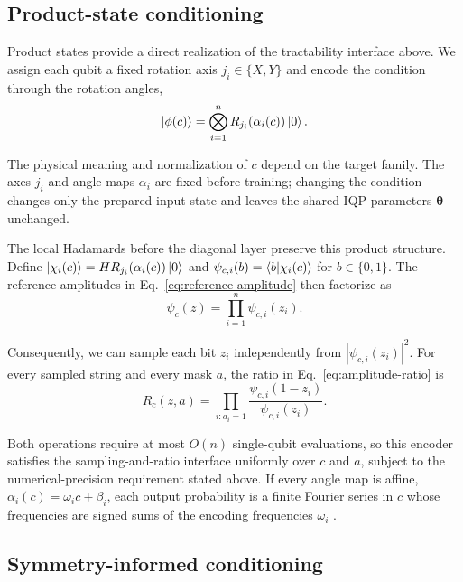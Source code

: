 \documentclass[pra,aps,10pt,twocolumn,floatfix,superscriptaddress,
notitlepage,longbibliography]{revtex4-2}
\begin{document}
\subsection{Product-state conditioning}
Product states provide a direct realization of the tractability interface above. We assign each qubit a fixed rotation axis $j_i\in\{X,Y\}$ and encode the condition through the rotation angles,
\begin{equation}
    \ket{\phi(c)}=\bigotimes_{i=1}^{n}R_{j_i}\!\left(\alpha_i(c)\right)\ket{0}.
    \label{eq:product-encoder}
\end{equation}

The physical meaning and normalization of $c$ depend on the target family. The axes $j_i$ and angle maps $\alpha_i$ are fixed before training; changing the condition changes only the prepared input state and leaves the shared IQP parameters $\boldsymbol{\theta}$ unchanged.

The local Hadamards before the diagonal layer preserve this product structure. Define $\ket{\chi_i(c)}=H R_{j_i}(\alpha_i(c))\ket{0}$ and $\psi_{c,i}(b)=\braket{b|\chi_i(c)}$ for $b\in\{0,1\}$. The reference amplitudes in Eq.~\eqref{eq:reference-amplitude} then factorize as
\begin{equation}
    \psi_c(z)=\prod_{i=1}^{n}\psi_{c,i}(z_i).
    \label{eq:product-amplitudes}
\end{equation}

Consequently, we can sample each bit $z_i$ independently from $|\psi_{c,i}(z_i)|^2$. For every sampled string and every mask $a$, the ratio in Eq.~\eqref{eq:amplitude-ratio} is
\begin{equation}
    R_c(z,a)=\prod_{i:a_i=1}\frac{\psi_{c,i}(1-z_i)}{\psi_{c,i}(z_i)}.
    \label{eq:product-amplitude-ratio}
\end{equation}

Both operations require at most $O(n)$ single-qubit evaluations, so this encoder satisfies the sampling-and-ratio interface uniformly over $c$ and $a$, subject to the numerical-precision requirement stated above. If every angle map is affine, $\alpha_i(c)=\omega_i c+\beta_i$, each output probability is a finite Fourier series in $c$ whose frequencies are signed sums of the encoding frequencies $\omega_i$ \cite{schuldEffectDataEncoding2021,casasMultidimensionalFourier2023}.

\subsection{Symmetry-informed conditioning}
\end{document}
